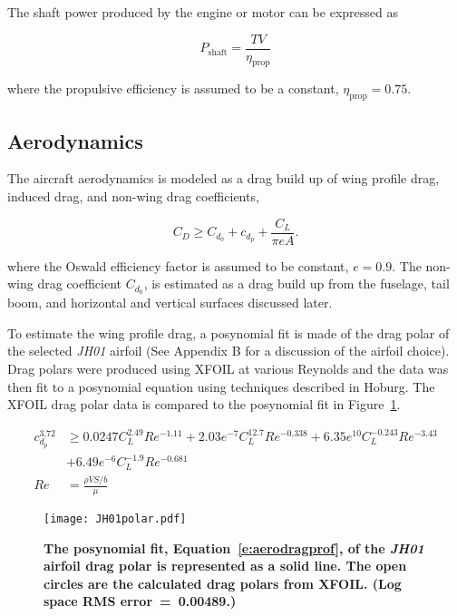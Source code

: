 \documentclass[]{aiaa-tc}%
\begin{document}
The shaft power produced by the engine or motor can be expressed as  

\begin{equation}
    \label{e:slfpower}
    P_{\text{shaft}} = \frac{TV}{\eta_{\text{prop}}}
    \end{equation}

    where the propulsive efficiency is assumed to be a constant, $\eta_{\text{prop}} = 0.75$. 

\subsection{Aerodynamics}

The aircraft aerodynamics is modeled as a drag build up of wing profile drag, induced drag, and non-wing drag coefficients, 

\begin{equation}
    \label{e:aerodragb}
    C_D \geq C_{d_0} + c_{d_p} + \frac{C_L}{\pi e A}.
    \end{equation}

where the Oswald efficiency factor is assumed to be constant, $e=0.9$. 
The non-wing drag coefficient $C_{d_0}$, is estimated as a drag build up from the fuselage, tail boom, and horizontal and vertical surfaces discussed later.
    
    To estimate the wing profile drag, a posynomial fit is made of the drag polar of the selected \emph{JH01} airfoil (See Appendix B for a discussion of the airfoil choice). 
    Drag polars were produced using XFOIL at various Reynolds and the data was then fit to a posynomial equation using techniques described in Hoburg.\cite{fitting}
    The XFOIL drag polar data is compared to the posynomial fit in Figure~\ref{f:JH01polar}.

    \begin{align}
        \label{e:aerodragprof}
        c_{d_p}^{3.72} &\geq 0.0247C_L^{2.49}Re^{-1.11} + 2.03e^{-7}C_L^{12.7}Re^{-0.338} + 6.35e^{10}C_L^{-0.243}Re^{-3.43} \nonumber \\
                       &+ 6.49e^{-6}C_L^{-1.9}Re^{-0.681} \\
        Re &= \frac{\rho V S/b}{\mu}
    \end{align}

\begin{figure}[H]
	\begin{center}
	\texttt{[image: JH01polar.pdf]}
    \caption{\textbf{The posynomial fit, Equation~\eqref{e:aerodragprof}, of the \emph{JH01} airfoil drag polar is represented as a solid line.  The open circles are the calculated drag polars from XFOIL. (Log space RMS error~=~0.00489.)}}
	\label{f:JH01polar}
	\end{center}
\end{figure}
\end{document}

